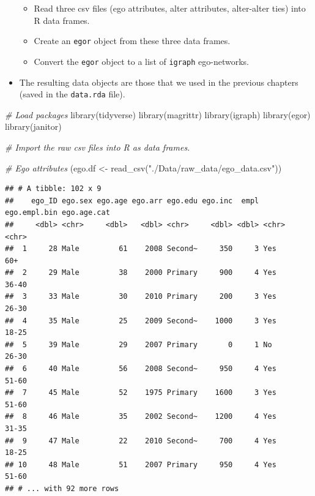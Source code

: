 \documentclass[
]{book}
\newenvironment{Shaded}{\begin{snugshade}}{\end{snugshade}}
\newcommand{\CommentTok}[1]{\textcolor[rgb]{0.56,0.35,0.01}{\textit{#1}}}
\newcommand{\FunctionTok}[1]{\textcolor[rgb]{0.00,0.00,0.00}{#1}}
\newcommand{\NormalTok}[1]{#1}
\newcommand{\OtherTok}[1]{\textcolor[rgb]{0.56,0.35,0.01}{#1}}
\newcommand{\StringTok}[1]{\textcolor[rgb]{0.31,0.60,0.02}{#1}}
\providecommand{\tightlist}{%
  \setlength{\itemsep}{0pt}\setlength{\parskip}{0pt}}
\begin{document}
\begin{itemize}
  \begin{itemize}
  \tightlist
  \item
    Read three csv files (ego attributes, alter attributes, alter-alter ties) into R data frames.
  \item
    Create an \texttt{egor} object from these three data frames.
  \item
    Convert the \texttt{egor} object to a list of \texttt{igraph} ego-networks.
  \end{itemize}
\item
  The resulting data objects are those that we used in the previous chapters (saved in the \texttt{data.rda} file).
\end{itemize}

\begin{Shaded}
\begin{Highlighting}[]
\CommentTok{\# Load packages}
\FunctionTok{library}\NormalTok{(tidyverse)}
\FunctionTok{library}\NormalTok{(magrittr)}
\FunctionTok{library}\NormalTok{(igraph)}
\FunctionTok{library}\NormalTok{(egor)}
\FunctionTok{library}\NormalTok{(janitor)}

\CommentTok{\# Import the raw csv files into R as data frames.}

\CommentTok{\# Ego attributes}
\NormalTok{(ego.df }\OtherTok{\textless{}{-}} \FunctionTok{read\_csv}\NormalTok{(}\StringTok{"./Data/raw\_data/ego\_data.csv"}\NormalTok{))}
\end{Highlighting}
\end{Shaded}

\begin{verbatim}
## # A tibble: 102 x 9
##    ego_ID ego.sex ego.age ego.arr ego.edu ego.inc  empl ego.empl.bin ego.age.cat
##     <dbl> <chr>     <dbl>   <dbl> <chr>     <dbl> <dbl> <chr>        <chr>      
##  1     28 Male         61    2008 Second~     350     3 Yes          60+        
##  2     29 Male         38    2000 Primary     900     4 Yes          36-40      
##  3     33 Male         30    2010 Primary     200     3 Yes          26-30      
##  4     35 Male         25    2009 Second~    1000     3 Yes          18-25      
##  5     39 Male         29    2007 Primary       0     1 No           26-30      
##  6     40 Male         56    2008 Second~     950     4 Yes          51-60      
##  7     45 Male         52    1975 Primary    1600     3 Yes          51-60      
##  8     46 Male         35    2002 Second~    1200     4 Yes          31-35      
##  9     47 Male         22    2010 Second~     700     4 Yes          18-25      
## 10     48 Male         51    2007 Primary     950     4 Yes          51-60      
## # ... with 92 more rows
\end{verbatim}
\end{document}
